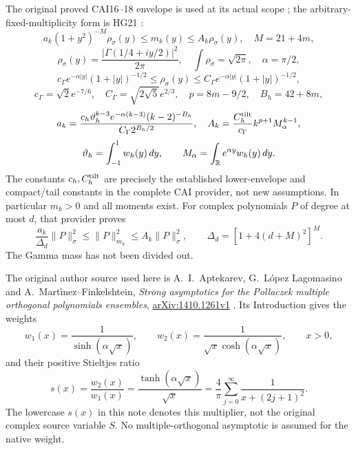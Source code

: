 \documentclass[11pt]{article}
\begin{document}
The original proved CAI16--18 envelope is used at its actual scope
\cite{parity:CAI}; the arbitrary-fixed-multiplicity form is HG21 \cite{parity:HG}:
\begin{equation}\label{parity:eq:CAI}
 a_k(1+y^2)^{-M}\rho_\sigma(y)\leq m_k(y)\leq A_k\rho_\sigma(y),
 \quad M=21+4m,
\end{equation}
\[
 \rho_\sigma(y)=\frac{|\Gamma(1/4+iy/2)|^2}{2\pi},\quad
 \int\rho_\sigma=\sqrt{2\pi},\quad\alpha=\pi/2,
\]
\[
 c_\Gamma e^{-\alpha|y|}(1+|y|)^{-1/2}
 \leq\rho_\sigma(y)\leq
 C_\Gamma e^{-\alpha|y|}(1+|y|)^{-1/2},
\]
\[
 c_\Gamma=\sqrt2e^{-7/6},\quad C_\Gamma=\sqrt{2\sqrt5}e^{2/3},
 \quad p=8m-9/2,\quad B_h=42+8m,
\]
\[
 a_k=\frac{c_h\vartheta_h^{k-3}e^{-\alpha(k-3)}(k-2)^{-B_h}}
                   {C_\Gamma2^{B_h/2}},\quad
 A_k=\frac{C_h^{\rm tilt}}{c_\Gamma}k^{p+1}M_\alpha^{k-1},
\]
\[
 \vartheta_h=\int_{-1}^1w_h(y)\,dy,\qquad
 M_\alpha=\int_\mathbb R e^{\alpha y}w_h(y)\,dy.
\]
The constants $c_h,C_h^{\rm tilt}$ are precisely the established
lower-envelope and compact/tail constants in the complete CAI
provider, not new assumptions. In particular $m_k>0$ and all
moments exist. For complex polynomials $P$ of degree at most $d$,
that provider proves
\begin{equation}\label{parity:eq:CAI-finite}
 \frac{a_k}{\Delta_d}\|P\|_\sigma^2
       \leq\|P\|_{m_k}^2\leq A_k\|P\|_\sigma^2,
 \qquad \Delta_d=[1+4(d+M)^2]^M.
\end{equation}
The Gamma mass has not been divided out.

The original author source used here is A.~I.~Aptekarev,
G.~L\'opez Lagomasino and A.~Mart\'{\i}nez--Finkelshtein,
\emph{Strong asymptotics for the Pollaczek multiple orthogonal
polynomials ensembles},
\href{https://arxiv.org/abs/1410.1261v1}{arXiv:1410.1261v1}
\cite{parity:ALM}.
Its Introduction gives the weights
\begin{equation}\label{parity:eq:literature}
 w_1(x)=\frac1{\sinh(\alpha\sqrt x)},\qquad
 w_2(x)=\frac1{\sqrt x\cosh(\alpha\sqrt x)},\qquad x>0,
\end{equation}
and their positive Stieltjes ratio
\begin{equation}\label{parity:eq:S}
 s(x)=\frac{w_2(x)}{w_1(x)}
     =\frac{\tanh(\alpha\sqrt x)}{\sqrt x}
     =\frac4\pi\sum_{j=0}^{\infty}\frac1{x+(2j+1)^2}.
\end{equation}
The lowercase $s(x)$ in this note denotes this multiplier, not
the original complex source variable $S$. No multiple-orthogonal
asymptotic is assumed for the native weight.
\end{document}
